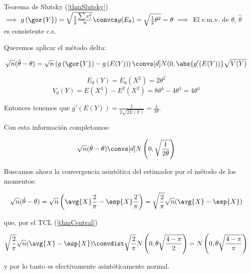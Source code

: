 \begin{problem}[5]
Teorema de Slutsky (\ref{thmSlutsky}) $\implies g\left(\gor{Y}\right) = \sqrt{\frac{1}{2} \frac{\sum x_i^2}{n}} \convcs g(E_{\theta}) = \sqrt{\frac{1}{2}\theta^2} = \theta \implies $ El e.m.v. de $\theta$, $\hat{\theta}$ es consistente c.s.


\spart

Queremos aplicar el método delta:

\[\sqrt{n}(\hat{\theta} - \theta) = \sqrt{n}\left(g\left(\gor{Y}\right) - g\left(E(Y)\right)\right) \convs[d]N(0,\abs{g'(E(Y))}\sqrt{V(Y)}\]

\[E_{\theta}(Y) = E_{\theta} (X^2) = 2\theta^2\]
\[V_{\theta}(Y) = E(X^4) - E^2(X^2) = 8\theta^4-4\theta^4 = 4\theta^4\]

Entonces tenemos que $g'(E(Y)) = \displaystyle \frac{1}{2\sqrt{2E(Y)}} = \frac{1}{4\theta}$.

Con esta información completamos:  

\[\sqrt{n}(\hat{\theta} - \theta) \convs[d] N\left(0,\sqrt{\frac{1}{2\theta}}\right)\]

Buscamos ahora la convergencia asintótica del estimador por el método de los momentos:

\[ \sqrt{n}(\tilde\theta-\theta) = \sqrt{n}\left(\avg{X}\frac{2}{\pi}  - \esp{X}\frac{2}{\pi}\right) = \sqrt{\frac{2}{\pi}}\sqrt{n}(\avg{X}-\esp{X}) \]

que, por el TCL (\ref{thmCentral})

\[ \sqrt{\frac{2}{\pi}}\sqrt{n}(\avg{X}-\esp{X})  \convdist  \sqrt{\frac{2}{\pi}}N\left(0,\theta\sqrt{\frac{4-\pi}{2}}\right) = N\left(0,\theta\sqrt{\frac{4-\pi}{\pi}}\right) \]

y por lo tanto es efectivamente asintóticamente normal.

\end{problem}


